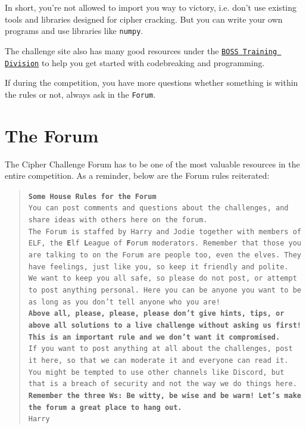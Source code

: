In short, you're not allowed to import you way to victory, i.e. don’t use existing tools and libraries designed for cipher cracking. But you can write your own programs and use libraries like \texttt{numpy}. 

The challenge site also has many good resources under the \texttt{\href{https://www.cipherchallenge.org/resources-media/}{BOSS Training Division}} to help you get started with codebreaking and programming. 

If during the competition, you have more questions whether something is within the rules or not, always ask in the \texttt{Forum}.

\section{The Forum}

The Cipher Challenge Forum has to be one of the most valuable resources in the entire competition. As a reminder, below are the Forum rules reiterated: 

\begin{quote}
    \texttt{\textbf{Some House Rules for the Forum } \\
You can post comments and questions about the challenges, and share ideas with others here on the forum. \\
The Forum is staffed by Harry and Jodie together with members of ELF,  the \textbf{E}lf \textbf{L}eague of \textbf{F}orum moderators. Remember that those you are talking to on the Forum are people too, even the elves. They have feelings, just like you, so keep it friendly and polite.\\
We want to keep you all safe, so please do not post, or attempt to post anything personal.  Here you can be anyone you want to be as long as you don't tell anyone who you are! \\
\textbf{Above all, please, please, please don't give hints, tips, or above all solutions to a live challenge without asking us first! This is an important rule and we don't want it compromised.}\\
If you want to post anything at all about the challenges, post it here, so that we can moderate it and everyone can read it. You might be tempted to use other channels like Discord, but that is a breach of security and not the way we do things here. \\
\textbf{Remember the three Ws: Be witty, be wise and be warm! Let's make the forum a great place to hang out.} \\Harry}
\end{quote}

